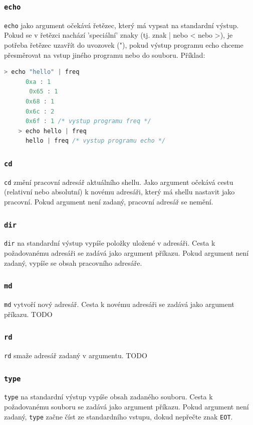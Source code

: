 \documentclass[12pt, a4paper]{article}
\begin{document}
    \subsubsection*{\texttt{echo}}
    \texttt{echo} jako argument očekává řetězec, který má vypsat na standardní výstup. Pokud se v řetězci nachází 'speciální' znaky (tj. znak | nebo < nebo >), je potřeba řetězec uzavřít do uvozovek ("{}), pokud výstup programu echo chceme přesměrovat na vstup jiného programu nebo do souboru.
    Příklad:
    \begin{lstlisting}[language=C, caption={Ukázka chování programu echo},captionpos=b]
    > echo "hello" | freq
      0xa : 1
	   0x65 : 1
      0x68 : 1
      0x6c : 2
      0x6f : 1 /* vystup programu freq */
    > echo hello | freq
      hello | freq /* vystup programu echo */
    \end{lstlisting}
    
    \subsubsection*{\texttt{cd}}
    \texttt{cd} změní pracovní adresář aktuálního shellu. Jako argument očekává cestu (relativní nebo absolutní) k novému adresáři, který má shellu nastavit jako pracovní. Pokud argument není zadaný, pracovní adresář se nemění.
    
    \subsubsection*{\texttt{dir}}
    \texttt{dir} na standardní výstup vypíše položky uložené v adresáři. Cesta k požadovanému adresáři se zadává jako argument příkazu. Pokud argument není zadaný, vypíše se obsah pracovního adresáře.
    
    \subsubsection*{\texttt{md}}
    \texttt{md} vytvoří nový adresář. Cesta k novému adresáři se zadává jako argument příkazu. TODO
    
    \subsubsection*{\texttt{rd}}
    \texttt{rd} smaže adresář zadaný v argumentu. TODO
    
    \subsubsection*{\texttt{type}}
    \texttt{type} na standardní výstup vypíše obsah zadaného souboru. Cesta k požadovanému souboru se zadává jako argument příkazu. Pokud argument není zadaný, \texttt{type} začne číst ze standardního vstupu, dokud nepřečte znak \texttt{EOT}.
    
\end{document}
